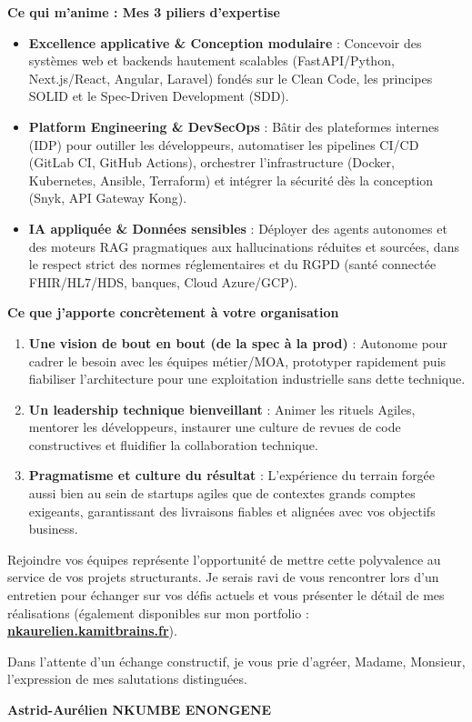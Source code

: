 \documentclass[10pt,a4paper]{article}
\begin{document}
\textbf{\color{primary}Ce qui m'anime : Mes 3 piliers d'expertise}
\begin{itemize}[leftmargin=1.3em, itemsep=0.1em, topsep=0.15em]
    \item \textbf{Excellence applicative \& Conception modulaire} : Concevoir des systèmes web et backends hautement scalables (FastAPI/Python, Next.js/React, Angular, Laravel) fondés sur le Clean Code, les principes SOLID et le Spec-Driven Development (SDD).
    \item \textbf{Platform Engineering \& DevSecOps} : Bâtir des plateformes internes (IDP) pour outiller les développeurs, automatiser les pipelines CI/CD (GitLab CI, GitHub Actions), orchestrer l'infrastructure (Docker, Kubernetes, Ansible, Terraform) et intégrer la sécurité dès la conception (Snyk, API Gateway Kong).
    \item \textbf{IA appliquée \& Données sensibles} : Déployer des agents autonomes et des moteurs RAG pragmatiques aux hallucinations réduites et sourcées, dans le respect strict des normes réglementaires et du RGPD (santé connectée FHIR/HL7/HDS, banques, Cloud Azure/GCP).
\end{itemize}

\textbf{\color{primary}Ce que j'apporte concrètement à votre organisation}
\begin{enumerate}[leftmargin=1.3em, itemsep=0.1em, topsep=0.15em]
    \item \textbf{Une vision de bout en bout (de la spec à la prod)} : Autonome pour cadrer le besoin avec les équipes métier/MOA, prototyper rapidement puis fiabiliser l'architecture pour une exploitation industrielle sans dette technique.
    \item \textbf{Un leadership technique bienveillant} : Animer les rituels Agiles, mentorer les développeurs, instaurer une culture de revues de code constructives et fluidifier la collaboration technique.
    \item \textbf{Pragmatisme et culture du résultat} : L'expérience du terrain forgée aussi bien au sein de startups agiles que de contextes grands comptes exigeants, garantissant des livraisons fiables et alignées avec vos objectifs business.
\end{enumerate}

Rejoindre vos équipes représente l'opportunité de mettre cette polyvalence au service de vos projets structurants. Je serais ravi de vous rencontrer lors d’un entretien pour échanger sur vos défis actuels et vous présenter le détail de mes réalisations (également disponibles sur mon portfolio : \href{https://nkaurelien.kamitbrains.fr}{\textbf{nkaurelien.kamitbrains.fr}}).

Dans l'attente d'un échange constructif, je vous prie d'agréer, Madame, Monsieur, l'expression de mes salutations distinguées.

\vspace{0.8em}

\begin{flushright}
    \textbf{Astrid-Aurélien NKUMBE ENONGENE}
\end{flushright}
\end{document}
